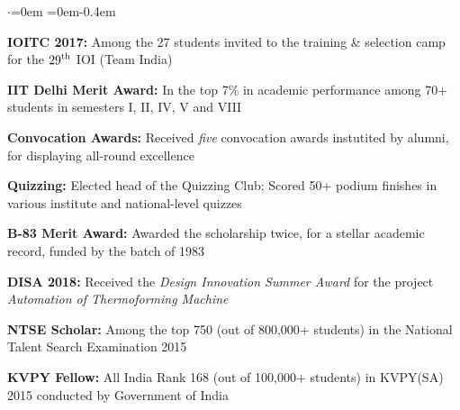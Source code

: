 \documentclass[letterpaper,10pt]{resume}
\newcommand{\resumeItem }[2]{
  \item\small{
    \textbf{#1}{: #2 \vspace{-4.5pt}}
  }
}
\newcommand{\resumeSubItem}[2]{\resumeItem{#1}{#2}\vspace{0pt}}
\newcommand{\resumeSubHeadingListStart}{\begin{itemize}[leftmargin=*]}
\begin{document}
\begin{list}{$\cdot$}{\leftmargin=0em \rightmargin=0em}\itemsep -0.4em \vspace{-0.6em}
    \item \textbf{IOITC 2017:} Among the 27 students invited to the training \& selection camp for the ${29}^{\textnormal{th}}$ IOI (Team India)
    \item \textbf{IIT Delhi Merit Award:} In the top 7\% in academic performance among 70+ students in semesters I, II, IV, V and VIII
    \item \textbf{Convocation Awards:} Received \textit{five} convocation awards instutited by alumni, for displaying all-round excellence
    \item \textbf{Quizzing:} Elected head of the Quizzing Club; Scored 50+ podium finishes in various institute and national-level quizzes
    \item \textbf{B-83 Merit Award:} Awarded the scholarship twice, for a stellar academic record, funded by the batch of 1983
    \item \textbf{DISA 2018:} Received the \textit{Design Innovation Summer Award} for the project \textit{Automation of Thermoforming Machine}
    \item \textbf{NTSE Scholar:} Among the top 750 (out of 800,000+ students) in the National Talent Search Examination 2015
    \item \textbf{KVPY Fellow:} All India Rank 168 (out of 100,000+ students) in KVPY(SA) 2015 conducted by Government of India
\end{list}{}
  
  
    
\end{document}
